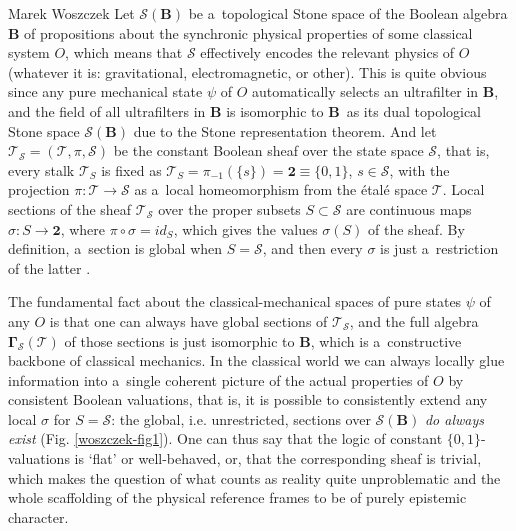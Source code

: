 \begin{artengenv}{Marek Woszczek}
Let $\mathcal{S}(\bm{B})$ be a~topological Stone space of the Boolean algebra $\bm{B}$ of propositions about the synchronic physical properties of some classical system $O$, which means that $\mathcal{S}$ effectively encodes the relevant physics of $O$ (whatever it is: gravitational, electromagnetic, or other). This is quite obvious since any pure mechanical state $\psi $ of $O$ automatically selects an ultrafilter in $\bm{B}$, and the field of all ultrafilters in $\bm{B}$ is isomorphic to $\bm{B}$~as its dual topological Stone space $\mathcal{S}(\bm{B})$ due to the Stone representation theorem. And let $\bm{\mathcal{T}}_{\mathcal{S}} = (\mathcal{T}, \pi, \mathcal{S})$ be the constant Boolean sheaf over the state space $\mathcal{S}$, that is, every stalk $\mathcal{T}_{S}$ is fixed as $\mathcal{T}_{S} = \pi_{-1}(\{s\}) = \bm{2} \equiv \{0,1\}$, $s{\in}\mathcal{S}$, with the projection $\pi:\mathcal{T}\to\mathcal{S}$ as a~local homeomorphism from the étalé space $\mathcal{T}$. Local sections of the sheaf $\bm{\mathcal{T}}_{\mathcal{S}}$ over the proper subsets $S{\subset}\mathcal{S}$ are continuous maps $\sigma :S\to \mathbf{2}$, where $\pi \circ \sigma = id_S$, which gives the values $\sigma(S)$ of the sheaf. By definition, a~section is global when $S = \mathcal{S}$, and then every $\sigma $ is just a~restriction of the latter
\parencites[][chap.II]{mac_lane_sheaves_1992}[][]{mac_lane_sheaves_1992}.%


The fundamental fact about the classical-mechanical spaces of pure states $\psi $ of any $O$ is that one can always have global sections of $\bm{\mathcal{T}}_{\mathcal{S}}$, and the full algebra $\bm{\Gamma}_{\mathcal{S}}(\mathcal{T})$ of those sections is just isomorphic to $\bm{B}$, which is a~constructive backbone of classical mechanics. In the classical world we can always locally glue information into a~single coherent picture of the actual properties of $O$ by consistent Boolean valuations, that is, it is possible to consistently extend any local $\sigma$ for $S=\mathcal{S}$: the global, i.e. unrestricted, sections over $\mathcal{S}(\bm{B})$ \textit{do always exist} (Fig. \ref{woszczek-fig1}). One can thus say that the logic of constant $\{0,1\}$-valuations is ‘flat' or well-behaved, or, that the corresponding sheaf is trivial, which makes the question of what counts as reality quite unproblematic and the whole scaffolding of the physical reference frames to be of purely epistemic character.


\end{artengenv}
